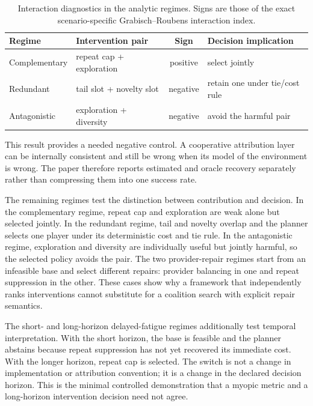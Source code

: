 \documentclass[review]{elsarticle}
\theoremstyle{plain}
\theoremstyle{definition}
\theoremstyle{remark}
\begin{document}
\begin{table}[t]
\caption{Interaction diagnostics in the analytic regimes. Signs are those of the exact scenario-specific Grabisch--Roubens interaction index.}\label{tab:interaction-diagnostics}
\centering
\scriptsize
\setlength{\tabcolsep}{4pt}
\begin{tabularx}{\linewidth}{@{}lXcl@{}}
\toprule
Regime & Intervention pair & Sign & Decision implication\\
\midrule
Complementary & repeat cap + exploration & positive & select jointly\\
Redundant & tail slot + novelty slot & negative & retain one under tie/cost rule\\
Antagonistic & exploration + diversity & negative & avoid the harmful pair\\
\bottomrule
\end{tabularx}
\end{table}

This result provides a needed negative control. A cooperative attribution layer can be internally consistent and still be wrong when its model of the environment is wrong. The paper therefore reports estimated and oracle recovery separately rather than compressing them into one success rate.

The remaining regimes test the distinction between contribution and decision. In the complementary regime, repeat cap and exploration are weak alone but selected jointly. In the redundant regime, tail and novelty overlap and the planner selects one player under its deterministic cost and tie rule. In the antagonistic regime, exploration and diversity are individually useful but jointly harmful, so the selected policy avoids the pair. The two provider-repair regimes start from an infeasible base and select different repairs: provider balancing in one and repeat suppression in the other. These cases show why a framework that independently ranks interventions cannot substitute for a coalition search with explicit repair semantics.

The short- and long-horizon delayed-fatigue regimes additionally test temporal interpretation. With the short horizon, the base is feasible and the planner abstains because repeat suppression has not yet recovered its immediate cost. With the longer horizon, repeat cap is selected. The switch is not a change in implementation or attribution convention; it is a change in the declared decision horizon. This is the minimal controlled demonstration that a myopic metric and a long-horizon intervention decision need not agree.
\end{document}
